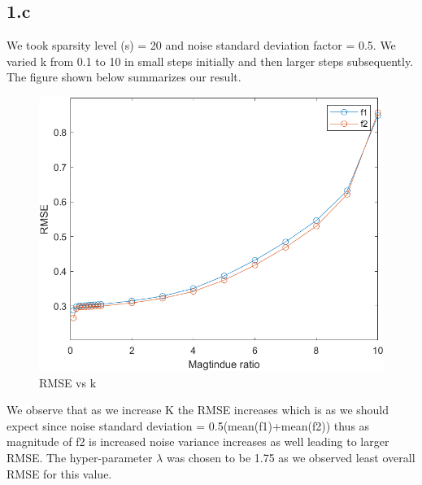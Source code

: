 \documentclass[12pt]{article}
\begin{document}
\subsection*{1.c}
We took sparsity level (s) = 20 and noise standard deviation factor = 0.5. We varied k from 0.1 to 10 in small steps initially and then larger steps subsequently. The figure shown below summarizes our result.
\begin{figure}[H]
  \centering
  \includegraphics[scale=0.75]{assignment4/rmse_mag.png}  %
  \caption{RMSE vs k}
  \label{fig:2}
\end{figure}
We observe that as we increase K the RMSE increases which is as we should expect since noise standard deviation = 0.5(mean(f1)+mean(f2)) thus as magnitude of f2 is increased noise variance increases as well leading to larger RMSE. The hyper-parameter $\lambda$ was chosen to be 1.75 as we observed least overall RMSE for this value.
\end{document}
